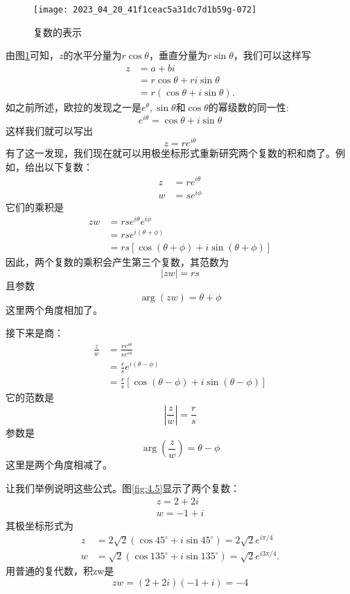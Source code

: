 \begin{figure}[htbp]
    \begin{center}
        \texttt{[image: 2023\_04\_20\_41f1ceac5a31dc7d1b59g-072]}
    \end{center}
    \caption[short]{复数的表示}
    \label{fig:4.4}
\end{figure}

由图\ref{fig:4.4}可知，$z$的水平分量为$r \cos \theta$，垂直分量为$r \sin \theta$，我们可以这样写
$$
    \begin{aligned}
        z & =a+b i                          \\
          & =r \cos \theta+r i \sin \theta  \\
          & =r(\cos \theta+i \sin \theta) .
    \end{aligned}
$$
如之前所述，欧拉的发现之一是$e^{\theta}, \sin \theta$和$\cos \theta$的幂级数的同一性:
$$
    e^{i \theta}=\cos \theta+i \sin \theta
$$
这样我们就可以写出
$$
    z=r e^{i \theta}
$$
有了这一发现，我们现在就可以用极坐标形式重新研究两个复数的积和商了。例如，给出以下复数：
$$
    \begin{aligned}
        z & =r e^{i \theta} \\
        w & =s e^{i \phi}
    \end{aligned}
$$
它们的乘积是
$$
    \begin{aligned}
        z w & =r s e^{i \theta} e^{i \phi}                  \\
            & =r s e^{i(\theta+\phi)}                       \\
            & =r s[\cos (\theta+\phi)+i \sin (\theta+\phi)]
    \end{aligned}
$$
因此，两个复数的乘积会产生第三个复数，其范数为
$$
    |z w|=r s
$$
且参数
$$
    \arg (z w)=\theta+\phi
$$
这里两个角度相加了。

接下来是商：
$$
    \begin{aligned}
        \frac{z}{w} & =\frac{r e^{i \theta}}{s e^{i \phi}}                  \\
                    & =\frac{r}{s} e^{i(\theta-\phi)}                       \\
                    & =\frac{r}{s}[\cos (\theta-\phi)+i \sin (\theta-\phi)]
    \end{aligned}
$$
它的范数是
$$
    \left|\frac{z}{w}\right|=\frac{r}{s}
$$
参数是
$$
    \arg \left(\frac{z}{w}\right)=\theta-\phi
$$
这里是两个角度相减了。

让我们举例说明这些公式。图\ref{fig:4.5}显示了两个复数：
$$
    \begin{gathered}
        z=2+2 i \\
        w=-1+i
    \end{gathered}
$$
其极坐标形式为
$$
    \begin{aligned}
        z & =2 \sqrt{2}\left(\cos 45^{\circ}+i \sin 45^{\circ}\right)=2 \sqrt{2} e^{i \pi / 4}   \\
        w & =\sqrt{2}\left(\cos 135^{\circ}+i \sin 135^{\circ}\right)=\sqrt{2} e^{i 3 \pi / 4} .
    \end{aligned}
$$
用普通的复代数，积zw是
$$
    z w=(2+2 i)(-1+i)=-4
$$


